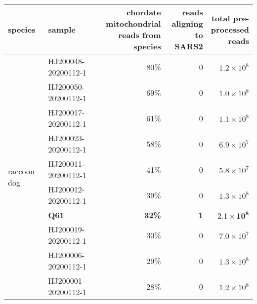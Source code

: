 \documentclass[9pt,twocolumn,twoside]{gsajnl_modified}
\begin{document}
\begin{table}

\setlength{\tabcolsep}{5pt}
\renewcommand{\arraystretch}{1.3}
\begin{tabular}{llrrr}
\toprule
species      &   sample              & \makecell[r]{chordate \\ mitochondrial \\ reads from \\ species} &  \makecell[r]{reads \\ aligning \\ to SARS2} & \makecell[r]{ total pre-\\processed \\ reads} \\ 
\midrule
\multirow{14}{*}{raccoon dog} & HJ200048-20200112-1 &                                80\% &                        0 &                   $1.2\times 10^8$ \\
                 & HJ200050-20200112-1 &                                69\% &                        0 &                     $1.0 \times 10^8$ \\
                 & HJ200017-20200112-1 &                                61\% &                        0 &                   $1.1 \times 10^8$ \\
                 & HJ200023-20200112-1 &                                58\% &                        0 &                   $6.9 \times 10^7$ \\
                 & HJ200011-20200112-1 &                                41\% &                        0 &                   $5.8 \times 10^7$ \\
                 & HJ200012-20200112-1 &                                39\% &                        0 &                   $1.3 \times 10^8$ \\
                 & {\bf Q61} &                                {\bf 32\%} &                        {\bf 1} &                   $\mathbf{2.1 \times 10^8}$ \\
                 & HJ200019-20200112-1 &                                30\% &                        0 &                     $7.0 \times 10^7$ \\
                 & HJ200006-20200112-1 &                                29\% &                        0 &                   $1.3 \times 10^8$ \\
                 & HJ200001-20200112-1 &                                28\% &                        0 &                   $1.2 \times 10^8$ \\

\end{tabular}
\end{table}
\end{document}
